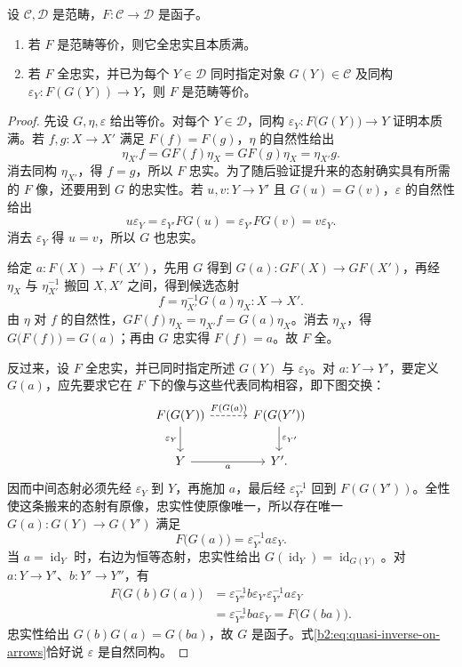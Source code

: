 \begin{theorem}[范畴等价的判据]\label{b2:thm:equivalence-criterion}
	设 \(\mathcal C,\mathcal D\) 是范畴，\(F:\mathcal C\rightarrow\mathcal D\) 是函子。
	\begin{enumerate}
		\item 若 \(F\) 是范畴等价，则它全忠实且本质满。
		\item 若 \(F\) 全忠实，并已为每个 \(Y\in\mathcal D\) 同时指定对象 \(G(Y)\in\mathcal C\) 及同构 \(\varepsilon_Y:F(G(Y))\to Y\)，则 \(F\) 是范畴等价。
	\end{enumerate}
\end{theorem}
\begin{proof}
	先设 \(G,\eta,\varepsilon\) 给出等价。对每个 \(Y\in\mathcal D\)，同构 \(\varepsilon_Y:F\bigl(G(Y)\bigr)\rightarrow Y\) 证明本质满。若 \(f,g:X\rightarrow X'\) 满足 \(F(f)=F(g)\)，\(\eta\) 的自然性给出
	\[
		\eta_{X'}f=GF(f)\eta_X=GF(g)\eta_X=\eta_{X'}g.
	\]
	消去同构 \(\eta_{X'}\)，得 \(f=g\)，所以 \(F\) 忠实。为了随后验证提升来的态射确实具有所需的 \(F\) 像，还要用到 \(G\) 的忠实性。若 \(u,v:Y\rightarrow Y'\) 且 \(G(u)=G(v)\)，\(\varepsilon\) 的自然性给出
	\[
		u\varepsilon_Y=\varepsilon_{Y'}FG(u) =\varepsilon_{Y'}FG(v)=v\varepsilon_Y.
	\]
	消去 \(\varepsilon_Y\) 得 \(u=v\)，所以 \(G\) 也忠实。

	给定 \(a:F(X)\rightarrow F(X')\)，先用 \(G\) 得到 \(G(a):GF(X)\rightarrow GF(X')\)，再经 \(\eta_X\) 与 \(\eta_{X'}^{-1}\) 搬回 \(X,X'\) 之间，得到候选态射
	\[
		f=\eta_{X'}^{-1}G(a)\eta_X:X\longrightarrow X'.
	\]
	由 \(\eta\) 对 \(f\) 的自然性，\(GF(f)\eta_X=\eta_{X'}f=G(a)\eta_X\)。消去 \(\eta_X\)，得 \(G\bigl(F(f)\bigr)=G(a)\)；再由 \(G\) 忠实得 \(F(f)=a\)。故 \(F\) 全。

	反过来，设 \(F\) 全忠实，并已同时指定所述 \(G(Y)\) 与 \(\varepsilon_Y\)。对 \(a:Y\rightarrow Y'\)，要定义 \(G(a)\)，应先要求它在 \(F\) 下的像与这些代表同构相容，即下图交换：
	\[
		\begin{tikzcd}[column sep=3em,row sep=2em]
			F(G(Y))\arrow[r,dashed,"F(G(a))"]\arrow[d,"\varepsilon_Y"']& F(G(Y'))\arrow[d,"\varepsilon_{Y'}"]\\
			Y\arrow[r,"a"']&Y'.
		\end{tikzcd}
	\]
	因而中间态射必须先经 \(\varepsilon_Y\) 到 \(Y\)，再施加 \(a\)，最后经 \(\varepsilon_{Y'}^{-1}\) 回到 \(F(G(Y'))\)。全性使这条搬来的态射有原像，忠实性使原像唯一，所以存在唯一 \(G(a):G(Y)\rightarrow G(Y')\) 满足
	\begin{equation}\label{b2:eq:quasi-inverse-on-arrows}
		F\bigl(G(a)\bigr)=\varepsilon_{Y'}^{-1}a\varepsilon_Y.
	\end{equation}
	当 \(a=\operatorname{id}_Y\) 时，右边为恒等态射，忠实性给出 \(G(\operatorname{id}_Y)=\operatorname{id}_{G(Y)}\)。对 \(a:Y\rightarrow Y'\)、\(b:Y'\rightarrow Y''\)，有
	\[
		\begin{aligned}
			F\bigl(G(b)G(a)\bigr) &=\varepsilon_{Y''}^{-1}b\varepsilon_{Y'}\varepsilon_{Y'}^{-1}a\varepsilon_Y\\
			&=\varepsilon_{Y''}^{-1}ba\varepsilon_Y=F\bigl(G(ba)\bigr).
		\end{aligned}
	\]
	忠实性给出 \(G(b)G(a)=G(ba)\)，故 \(G\) 是函子。式\eqref{b2:eq:quasi-inverse-on-arrows}恰好说 \(\varepsilon\) 是自然同构。


\end{proof}
